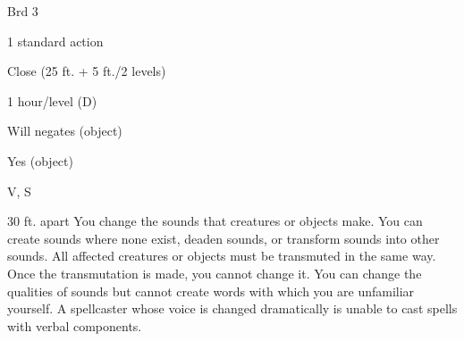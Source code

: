 
\begin{description*}
\item[Level:] Brd 3
\item[Casting Time:] 1 standard action
\item[Range:] Close (25 ft. + 5 ft./2 levels)
\item[Duration:] 1 hour/level (D)
\item[Saving Throw:] Will negates (object)
\item[Spell Resistance:] Yes (object)
\item[Components:] V, S
\end{description*}

30 ft. apart
You change the sounds that creatures or objects make. You can create sounds where
none exist, deaden sounds, or transform sounds into other sounds. All affected
creatures or objects must be transmuted in the same way. Once the transmutation
is made, you cannot change it.
You can change the qualities of sounds but cannot create words with which you are
unfamiliar yourself.
A spellcaster whose voice is changed dramatically is unable to cast spells with
verbal components.